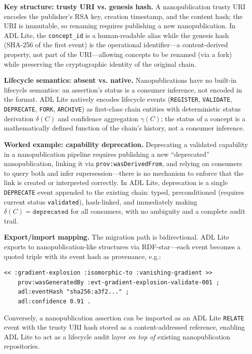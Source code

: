 \textbf{Key structure: trusty URI vs. genesis hash.} A nanopublication trusty URI encodes the publisher's RSA key, creation timestamp, and the content hash; the URI is immutable, so renaming requires publishing a new nanopublication. In ADL Lite, the \texttt{concept\_id} is a human-readable alias while the genesis hash (SHA-256 of the first event) is the operational identifier---a content-derived property, not part of the URI---allowing concepts to be renamed (via a fork) while preserving the cryptographic identity of the original chain.

\textbf{Lifecycle semantics: absent vs. native.} Nanopublications have no built-in lifecycle semantics: an assertion's status is a consumer inference, not encoded in the format. ADL Lite natively encodes lifecycle events (\texttt{REGISTER}, \texttt{VALIDATE}, \texttt{DEPRECATE}, \texttt{FORK}, \texttt{ARCHIVE}) as first-class chain entities with deterministic status derivation $\delta(C)$ and confidence aggregation $\gamma(C)$; the status of a concept is a mathematically defined function of the chain's history, not a consumer inference.

\textbf{Worked example: capability deprecation.} Deprecating a validated capability in a nanopublication pipeline requires publishing a new ``deprecated'' nanopublication, linking it via \texttt{prov:wasDerivedFrom}, and relying on consumers to query both and infer supersession---there is no mechanism to enforce that the link is created or interpreted correctly. In ADL Lite, deprecation is a single \texttt{DEPRECATE} event appended to the existing chain: typed, preconditioned (requires current status \texttt{validated}), hash-linked, and immediately making $\delta(C) = \texttt{deprecated}$ for all consumers, with no ambiguity and a complete audit trail.

\textbf{Export/import mapping.} The migration path is bidirectional. ADL Lite exports to nanopublication-like structures via RDF-star---each event becomes a quoted triple with its event hash as provenance, e.g.:
\begin{lstlisting}[language=Turtle]
<< :gradient-explosion :isomorphic-to :vanishing-gradient >>
    prov:wasGeneratedBy :evt-gradient-explosion-validate-001 ;
    adl:eventHash "sha256:a3f2..." ;
    adl:confidence 0.91 .
\end{lstlisting}
Conversely, a nanopublication assertion can be imported as an ADL Lite \texttt{RELATE} event with the trusty URI hash stored as a content-addressed reference, enabling ADL Lite to act as a lifecycle audit layer \emph{on top of} existing nanopublication repositories.


